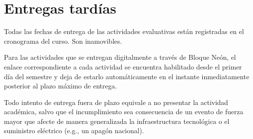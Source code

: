 \section{Entregas tardías}
Todas las fechas de entrega de las actividades evaluativas están registradas en el cronograma del curso. Son inamovibles.

Para las actividades que se entregan digitalmente a través de Bloque Neón, el enlace correspondiente a cada actividad se encuentra habilitado desde el primer día del semestre y deja de estarlo automáticamente en el instante inmediatamente posterior al plazo máximo de entrega.

Todo intento de entrega fuera de plazo equivale a no presentar la actividad académica, salvo que el incumplimiento sea consecuencia de un evento de fuerza mayor que afecte de manera generalizada la infraestructura tecnológica o el suministro eléctrico (e.g., un apagón nacional).

